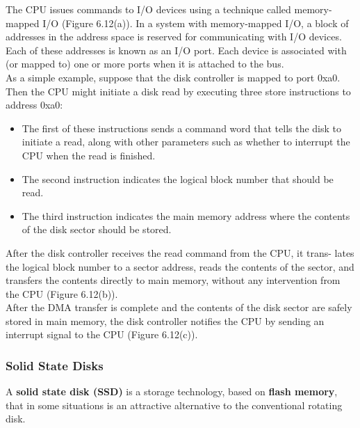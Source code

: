 \documentclass[11pt]{article}
\begin{document}
\begin{enumerate}
The CPU issues commands to I/O devices using a technique called memory- mapped I/O (Figure 6.12(a)). In a system with memory-mapped I/O, a block of addresses in the address space is reserved for communicating with I/O devices. Each of these addresses is known as an I/O port. Each device is associated with (or mapped to) one or more ports when it is attached to the bus.\\

As a simple example, suppose that the disk controller is mapped to port 0xa0. Then the CPU might initiate a disk read by executing three store instructions to address 0xa0:\\
\begin{itemize}
\item The first of these instructions sends a command word that tells the disk to initiate a read, along with other parameters such as whether to interrupt the CPU when the read is finished.\\
\item The second instruction indicates the logical block number that should be read.\\
\item The third instruction indicates the main memory address where the contents of the disk sector should be stored.\\
\end{itemize}

After the disk controller receives the read command from the CPU, it trans- lates the logical block number to a sector address, reads the contents of the sector, and transfers the contents directly to main memory, without any intervention from the CPU (Figure 6.12(b)).\\

After the DMA transfer is complete and the contents of the disk sector are safely stored in main memory, the disk controller notifies the CPU by sending an interrupt signal to the CPU (Figure 6.12(c)).\\
\end{enumerate}


\subsubsection{Solid State Disks}
\label{sec:orgd6c8f4a}
A \textbf{solid state disk (SSD)} is a storage technology, based on \textbf{flash memory}, that in some situations is an attractive alternative to the conventional rotating disk.\\
\end{document}
